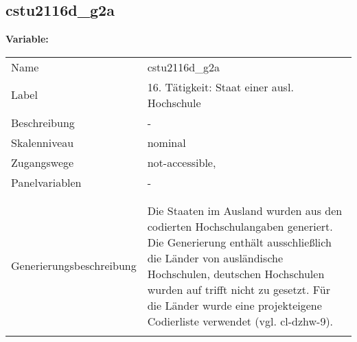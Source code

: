 	
	
	\subsection{cstu2116d\_g2a}
	\label{subSection:cstu2116d_g2a}

	\noindent\textbf{Variable:}\\
		\begin{tabular}{lL{11.3cm}}
			\label{tableVariable:cstu2116d_g2a}
			Name & cstu2116d\_g2a \\
			Label & 16. Tätigkeit: Staat einer ausl. Hochschule \\
			Beschreibung & - \\
			Skalenniveau & nominal \\
			Zugangswege &
				not-accessible,
 \\
			Panelvariablen & -
			 \\
			 \\
 \\
					Generierungsbeschreibung & Die Staaten im Ausland wurden aus den codierten Hochschulangaben generiert. Die Generierung enthält ausschließlich die Länder von ausländische Hochschulen, deutschen Hochschulen wurden auf trifft nicht zu gesetzt. Für die Länder wurde eine projekteigene Codierliste verwendet (vgl. cl-dzhw-9).
				 \\	
			 \\
		\end{tabular}






	
	\newpage
